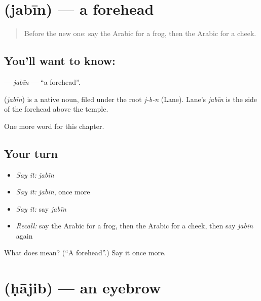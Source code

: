 \section[\texorpdfstring{\ar{جبين} (jabīn)}{جبين (jabīn)}]{ (jabīn) — a forehead}

\label{lesson:AR-C138-jabin}



\begin{quote}
Before the new one: say the Arabic for a frog, then the Arabic for a cheek.
\end{quote}

\subsection*{You'll want to know: }
\textbf{} — \emph{jabīn} — \textquotedblleft{}a forehead\textquotedblright{}.

\begin{cousinweb}
\textbf{} (\emph{jabīn}) is a native noun, filed under the root \emph{j-b-n} (Lane). Lane's \emph{jabīn} is the side of the forehead above the temple.
\end{cousinweb}

\begin{grammarlens}[title={What you've built}]
One more word for this chapter.
\end{grammarlens}

\subsection*{Your turn}
\begin{itemize}
\raggedright
  \item \emph{Say it:} \emph{jabīn}
  \item \emph{Say it:} \emph{jabīn}, once more
  \item \emph{Say it:} say \emph{jabīn}
  \item \emph{Recall:} say the Arabic for a frog, then the Arabic for a cheek, then say \emph{jabīn} again
\end{itemize}

\begin{tcolorbox}[breakable,colback=teal!4,colframe=teal!35!black,title={Before you move on}]
What does  mean? (\textquotedblleft{}A forehead\textquotedblright{}.) Say it once more.
\end{tcolorbox}
\section[\texorpdfstring{\ar{حاجب} (ḥājib)}{حاجب (ḥājib)}]{ (ḥājib) — an eyebrow}

